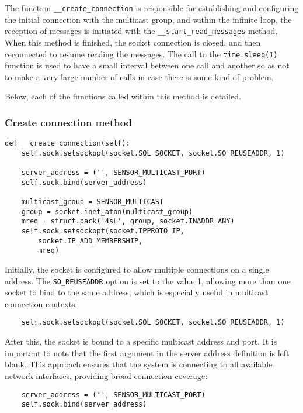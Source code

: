 The function \texttt{\_\_create\_connection} is responsible for establishing and configuring the initial connection with the multicast group, and within the infinite loop, the reception of messages is initiated with the \texttt{\_\_start\_read\_messages} method. When this method is finished, the socket connection is closed, and then reconnected to resume reading the messages. The call to the \texttt{time.sleep(1)} function is used to have a small interval between one call and another so as not to make a very large number of calls in case there is some kind of problem.

Below, each of the functions called within this method is detailed.

\subsubsection[Create connection method]{Create connection method}

\begin{verbatim}
def __create_connection(self):
    self.sock.setsockopt(socket.SOL_SOCKET, socket.SO_REUSEADDR, 1)

    server_address = ('', SENSOR_MULTICAST_PORT)
    self.sock.bind(server_address)

    multicast_group = SENSOR_MULTICAST
    group = socket.inet_aton(multicast_group)
    mreq = struct.pack('4sL', group, socket.INADDR_ANY)
    self.sock.setsockopt(socket.IPPROTO_IP,
        socket.IP_ADD_MEMBERSHIP,
        mreq)
\end{verbatim}

Initially, the socket is configured to allow multiple connections on a single address. The \texttt{SO\_REUSEADDR} option is set to the value 1, allowing more than one socket to bind to the same address, which is especially useful in multicast connection contexts:

\begin{verbatim}
    self.sock.setsockopt(socket.SOL_SOCKET, socket.SO_REUSEADDR, 1)
\end{verbatim}

After this, the socket is bound to a specific multicast address and port. It is important to note that the first argument in the server address definition is left blank. This approach ensures that the system is connecting to all available network interfaces, providing broad connection coverage:

\begin{verbatim}
    server_address = ('', SENSOR_MULTICAST_PORT)
    self.sock.bind(server_address)
\end{verbatim}

